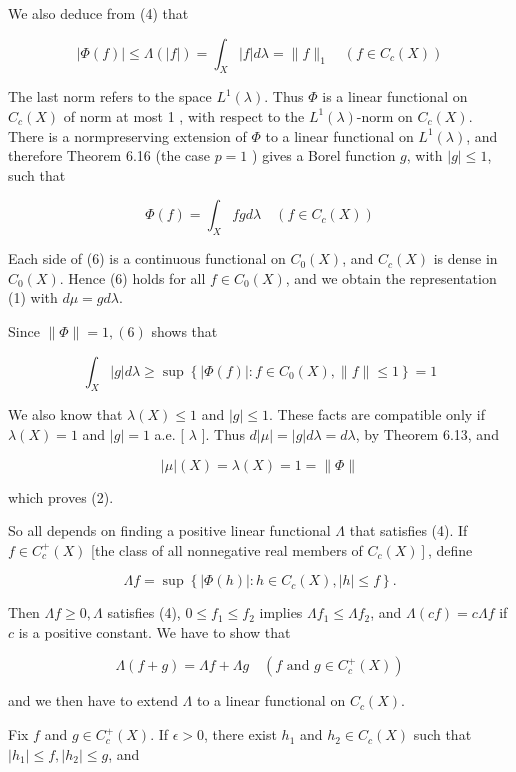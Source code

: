 \documentclass[10pt]{article}
\begin{document}
We also deduce from (4) that

$$
|\Phi(f)| \leq \Lambda(|f|)=\int_{X}|f| d \lambda=\|f\|_{1} \quad\left(f \in C_{c}(X)\right)
$$

The last norm refers to the space $L^{1}(\lambda)$. Thus $\Phi$ is a linear functional on $C_{c}(X)$ of norm at most 1 , with respect to the $L^{1}(\lambda)$-norm on $C_{c}(X)$. There is a normpreserving extension of $\Phi$ to a linear functional on $L^{1}(\lambda)$, and therefore Theorem 6.16 (the case $p=1$ ) gives a Borel function $g$, with $|g| \leq 1$, such that

$$
\Phi(f)=\int_{X} f g d \lambda \quad\left(f \in C_{c}(X)\right)
$$

Each side of (6) is a continuous functional on $C_{0}(X)$, and $C_{c}(X)$ is dense in $C_{0}(X)$. Hence (6) holds for all $f \in C_{0}(X)$, and we obtain the representation (1) with $d \mu=g d \lambda$.

Since $\|\Phi\|=1,(6)$ shows that

$$
\int_{X}|g| d \lambda \geq \sup \left\{|\Phi(f)|: f \in C_{0}(X),\|f\| \leq 1\right\}=1
$$

We also know that $\lambda(X) \leq 1$ and $|g| \leq 1$. These facts are compatible only if $\lambda(X)=1$ and $|g|=1$ a.e. [ $\lambda$ ]. Thus $d|\mu|=|g| d \lambda=d \lambda$, by Theorem 6.13, and

$$
|\mu|(X)=\lambda(X)=1=\|\Phi\|
$$

which proves (2).

So all depends on finding a positive linear functional $\Lambda$ that satisfies (4). If $f \in C_{c}^{+}(X)$ [the class of all nonnegative real members of $\left.C_{c}(X)\right]$, define

$$
\Lambda f=\sup \left\{|\Phi(h)|: h \in C_{c}(X),|h| \leq f\right\} .
$$

Then $\Lambda f \geq 0, \Lambda$ satisfies (4), $0 \leq f_{1} \leq f_{2}$ implies $\Lambda f_{1} \leq \Lambda f_{2}$, and $\Lambda(c f)=c \Lambda f$ if $c$ is a positive constant. We have to show that

$$
\Lambda(f+g)=\Lambda f+\Lambda g \quad\left(f \text { and } g \in C_{c}^{+}(X)\right)
$$

and we then have to extend $\Lambda$ to a linear functional on $C_{c}(X)$.

Fix $f$ and $g \in C_{c}^{+}(X)$. If $\epsilon>0$, there exist $h_{1}$ and $h_{2} \in C_{c}(X)$ such that $\left|h_{1}\right| \leq f,\left|h_{2}\right| \leq g$, and
\end{document}
